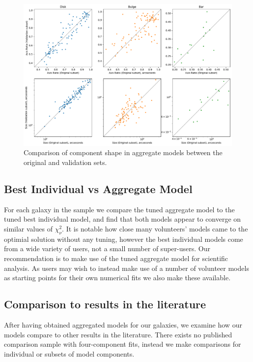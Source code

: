 \documentclass[../main.tex]{subfiles}
\begin{document}
\begin{figure}
  \includegraphics[width=17.3cm]{images__results/component_sizing.pdf}
  \caption{Comparison of component shape in aggregate models between the original and validation sets.}
  \label{fig:aggregate_model_consistency}
\end{figure}

\subsection{Best Individual vs Aggregate Model}

For each galaxy in the sample we compare the tuned aggregate model to the tuned best individual model, and find that both models appear to converge on similar values of $\chi_\nu^2$. It is notable how close many volunteers' models came to the optimial solution without any tuning, however the best individual models come from a wide variety of users, not a small number of super-users. Our recommendation is to make use of the tuned aggregate model for scientific analysis. As users may wish to instead make use of a number of volunteer models as starting points for their own numerical fits we also make these available.


\subsection{Comparison to results in the literature}

After having obtained aggregated models for our galaxies, we examine how our models compare to other results in the literature. There exists no published comparison sample with four-component fits, instead we make comparisons for individual or subsets of model components.
\end{document}
